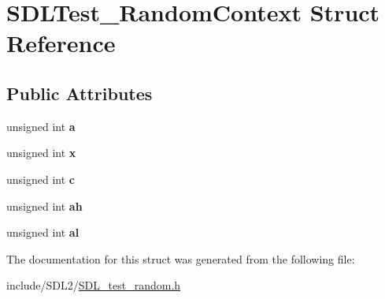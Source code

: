 \hypertarget{struct_s_d_l_test___random_context}{}\section{S\+D\+L\+Test\+\_\+\+Random\+Context Struct Reference}
\label{struct_s_d_l_test___random_context}
\subsection*{Public Attributes}
\begin{DoxyCompactItemize}
\item 
\mbox{\label{struct_s_d_l_test___random_context_a24f830d6cb476c96fbe325c99331e45f}} 
unsigned int {\bfseries a}
\item 
\mbox{\label{struct_s_d_l_test___random_context_a8bd6d1b4e1677ed1c06f5cc09f1af5b6}} 
unsigned int {\bfseries x}
\item 
\mbox{\label{struct_s_d_l_test___random_context_a17a6a7e7b68a33c67d9b74c8c7c33198}} 
unsigned int {\bfseries c}
\item 
\mbox{\label{struct_s_d_l_test___random_context_a2c8d2f1ee16cdfd38361b8f03b3fdb85}} 
unsigned int {\bfseries ah}
\item 
\mbox{\label{struct_s_d_l_test___random_context_a0e2bccd3611d383d6510c6c828aa54c4}} 
unsigned int {\bfseries al}
\end{DoxyCompactItemize}


The documentation for this struct was generated from the following file\+:\begin{DoxyCompactItemize}
\item 
include/\+S\+D\+L2/\hyperlink{_s_d_l__test__random_8h}{S\+D\+L\+\_\+test\+\_\+random.\+h}\end{DoxyCompactItemize}

